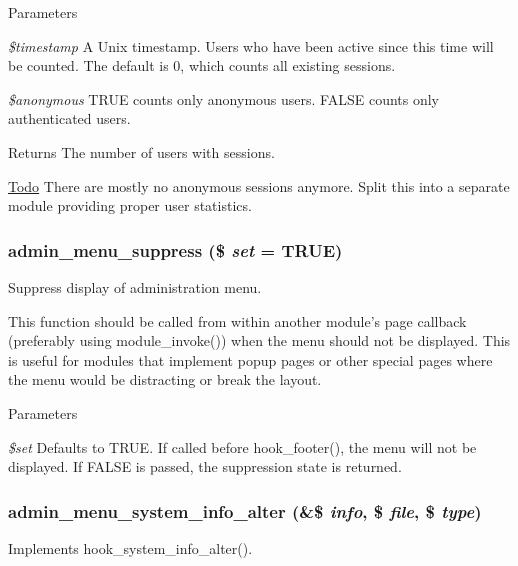 \begin{DoxyParams}{Parameters}
\item[{\em \$timestamp}]A Unix timestamp. Users who have been active since this time will be counted. The default is 0, which counts all existing sessions. \item[{\em \$anonymous}]TRUE counts only anonymous users. FALSE counts only authenticated users.\end{DoxyParams}
\begin{DoxyReturn}{Returns}
The number of users with sessions.
\end{DoxyReturn}
\begin{Desc}
\item[\hyperlink{todo__todo000002}{Todo}]There are mostly no anonymous sessions anymore. Split this into a separate module providing proper user statistics. \end{Desc}
\hypertarget{admin__menu_8module_a17cd6b917e0b38e8cd5392ae934473e0}{
\subsubsection[{admin\_\-menu\_\-suppress}]{\setlength{\rightskip}{0pt plus 5cm}admin\_\-menu\_\-suppress (\$ {\em set} = {\ttfamily TRUE})}}
\label{admin__menu_8module_a17cd6b917e0b38e8cd5392ae934473e0}
Suppress display of administration menu.

This function should be called from within another module's page callback (preferably using module\_\-invoke()) when the menu should not be displayed. This is useful for modules that implement popup pages or other special pages where the menu would be distracting or break the layout.


\begin{DoxyParams}{Parameters}
\item[{\em \$set}]Defaults to TRUE. If called before hook\_\-footer(), the menu will not be displayed. If FALSE is passed, the suppression state is returned. \end{DoxyParams}
\hypertarget{admin__menu_8module_a3694a156592ca88ad768a279d4524384}{
\subsubsection[{admin\_\-menu\_\-system\_\-info\_\-alter}]{\setlength{\rightskip}{0pt plus 5cm}admin\_\-menu\_\-system\_\-info\_\-alter (\&\$ {\em info}, \/  \$ {\em file}, \/  \$ {\em type})}}
\label{admin__menu_8module_a3694a156592ca88ad768a279d4524384}
Implements hook\_\-system\_\-info\_\-alter().

